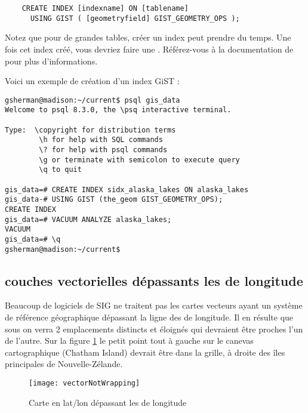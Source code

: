 \begin{verbatim}
    CREATE INDEX [indexname] ON [tablename]
      USING GIST ( [geometryfield] GIST_GEOMETRY_OPS );
\end{verbatim}

Notez que pour de grandes tables, créer un index peut prendre du temps. Une 
fois cet index créé, vous devriez faire une . 
Référez-vous à la documentation de \cite{PostGISweb} pour plus d'informations.

Voici un exemple de création d'un index GiST :
\begin{verbatim}
gsherman@madison:~/current$ psql gis_data
Welcome to psql 8.3.0, the \psq interactive terminal.

Type:  \copyright for distribution terms
        \h for help with SQL commands
        \? for help with psql commands
        \g or terminate with semicolon to execute query
        \q to quit

gis_data=# CREATE INDEX sidx_alaska_lakes ON alaska_lakes
gis_data-# USING GIST (the_geom GIST_GEOMETRY_OPS);
CREATE INDEX
gis_data=# VACUUM ANALYZE alaska_lakes;
VACUUM
gis_data=# \q
gsherman@madison:~/current$
\end{verbatim}

\subsection{couches vectorielles dépassants les  de longitude}

Beaucoup de logiciels de SIG ne traitent pas les cartes vecteurs ayant un système 
de référence géographique dépassant la ligne des  de longitude. 
Il en résulte que sous \qg on verra 2 emplacements distincts et éloignés qui 
devraient être proches l'un de l'autre. Sur la figure \ref{fig:vector_not_wrapping} 
le petit point tout à gauche sur le canevas cartographique (Chatham Island) 
devrait être dans la grille, à droite des îles principales de Nouvelle-Zélande.

\begin{figure}[ht]
   \begin{center}
   \texttt{[image: vectorNotWrapping]}
   \caption{Carte en lat/lon dépassant les  de longitude \nixcaption}
   \label{fig:vector_not_wrapping}
\end{center}
\end{figure}

